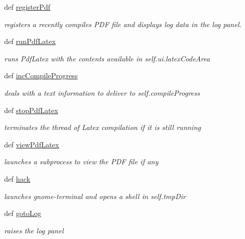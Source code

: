 \begin{DoxyCompactItemize}
def \hyperlink{classuicilibris_1_1w2mMainWindow_a4f2c62dae7e6c1085fd0f210c53257f4}{register\-Pdf}
\begin{DoxyCompactList}\small\item\em registers a recently compiles \-P\-D\-F file and displays log data in the log panel. \end{DoxyCompactList}\item 
def \hyperlink{classuicilibris_1_1w2mMainWindow_a3cfde91f57684cbb7bf7e54a3fecbeba}{run\-Pdf\-Latex}
\begin{DoxyCompactList}\small\item\em runs \-Pdf\-Latex with the contents available in self.\-ui.\-latex\-Code\-Area \end{DoxyCompactList}\item 
def \hyperlink{classuicilibris_1_1w2mMainWindow_a832d79edba89eabe0de87a3341bb9707}{inc\-Compile\-Progress}
\begin{DoxyCompactList}\small\item\em deals with a text information to deliver to self.\-compile\-Progress \end{DoxyCompactList}\item 
def \hyperlink{classuicilibris_1_1w2mMainWindow_abbbadefbe280076540bf281798cc2869}{stop\-Pdf\-Latex}
\begin{DoxyCompactList}\small\item\em terminates the thread of \-Latex compilation if it is still running \end{DoxyCompactList}\item 
def \hyperlink{classuicilibris_1_1w2mMainWindow_ab7460cd2f26720e6a131093d56bcc68a}{view\-Pdf\-Latex}
\begin{DoxyCompactList}\small\item\em launches a subprocess to view the \-P\-D\-F file if any \end{DoxyCompactList}\item 
def \hyperlink{classuicilibris_1_1w2mMainWindow_a55d3ee40c7ee582b4ce7af1ce91c92d7}{hack}
\begin{DoxyCompactList}\small\item\em launches gnome-\/terminal and opens a shell in self.\-tmp\-Dir \end{DoxyCompactList}\item 
def \hyperlink{classuicilibris_1_1w2mMainWindow_a7895d4ac97825f2105c4508a4b5e82f9}{goto\-Log}
\begin{DoxyCompactList}\small\item\em raises the log panel \end{DoxyCompactList}\end{DoxyCompactItemize}
